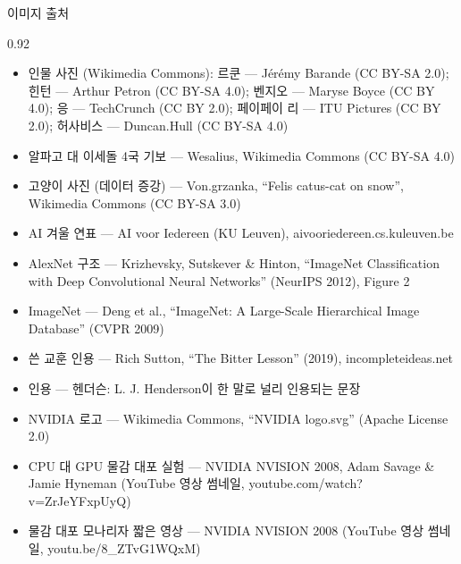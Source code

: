 \documentclass[aspectratio=169,11pt,t]{beamer}
\begin{document}
\begin{frame}{이미지 출처}
\begin{center}\begin{varwidth}{0.92\textwidth}
  \scriptsize
  \begin{itemize}
    \item 인물 사진 (Wikimedia Commons): 르쿤 --- Jérémy Barande (CC BY-SA 2.0); 힌턴 --- Arthur Petron (CC BY-SA 4.0);
      벤지오 --- Maryse Boyce (CC BY 4.0); 응 --- TechCrunch (CC BY 2.0); 페이페이 리 --- ITU Pictures (CC BY 2.0); 허사비스 --- Duncan.Hull (CC BY-SA 4.0)
    \item 알파고 대 이세돌 4국 기보 --- Wesalius, Wikimedia Commons (CC BY-SA 4.0)
    \item 고양이 사진 (데이터 증강) --- Von.grzanka, ``Felis catus-cat on snow'', Wikimedia Commons (CC BY-SA 3.0)
    \item AI 겨울 연표 --- AI voor Iedereen (KU Leuven), aivooriedereen.cs.kuleuven.be
    \item AlexNet 구조 --- Krizhevsky, Sutskever \& Hinton, ``ImageNet Classification with Deep Convolutional Neural Networks'' (NeurIPS 2012), Figure 2
    \item ImageNet --- Deng et al., ``ImageNet: A Large-Scale Hierarchical Image Database'' (CVPR 2009)
    \item 쓴 교훈 인용 --- Rich Sutton, ``The Bitter Lesson'' (2019), incompleteideas.net
    \item 인용 --- 헨더슨: L. J. Henderson이 한 말로 널리 인용되는 문장
    \item NVIDIA 로고 --- Wikimedia Commons, ``NVIDIA logo.svg'' (Apache License 2.0)
    \item CPU 대 GPU 물감 대포 실험 --- NVIDIA NVISION 2008, Adam Savage \& Jamie Hyneman (YouTube 영상 썸네일, youtube.com/watch?v=ZrJeYFxpUyQ)
    \item 물감 대포 모나리자 짧은 영상 --- NVIDIA NVISION 2008 (YouTube 영상 썸네일, youtu.be/8\_ZTvG1WQxM)
  \end{itemize}
\end{varwidth}\end{center}
\end{frame}
\end{document}
